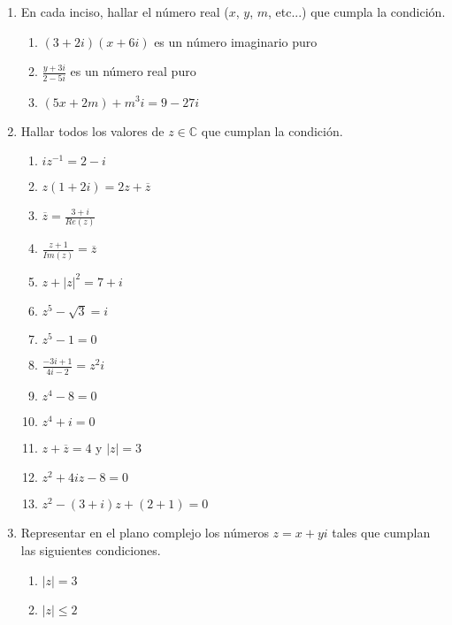 \documentclass[a4paper]{article}
\newcommand{\exercise}{\item}
\newcommand{\df}[2]{\displaystyle\frac{#1}{#2}}
\newcommand{\conj}[1]{\overline{#1}}
\begin{document}
\begin{enumerate}
\begin{multicols}{2}
\begin{enumerate} [label=(\alph*)]
		\item $|z.(1+2i)|^2=(|z|.|3+4i|)^2$
		\item $z+\conj{z} \in \mathbb{R}$
		\item $z-\conj{z} \not\in \mathbb{R}$
		\item $|z-w|=d(z,w)$
		\item $(z-\conj{z})^2=-4Im(z)^2$
	\end{enumerate}
	\end{multicols}
	\exercise En cada inciso, hallar el número real ($x$, $y$, $m$, etc...) que cumpla la condición.
	\begin{enumerate} [label=(\alph*)]
		\item $(3+2i)(x+6i)$ es un número imaginario puro
		\item $\df{y+3i}{2-5i}$ es un número real puro
		\item $(5x+2m)+m^3i = 9-27i$
	\end{enumerate}
	\exercise Hallar todos los valores de $z \in \mathbb{C}$ que cumplan la condición.
	\begin{multicols}{2}
	\begin{enumerate} [label=(\alph*)]
		\item $iz^{-1}=2-i$
		\item $z(1+2i)=2z+\conj{z}$
		\item $\conj{z}=\df{3+i}{Re(z)}$
		\item $\df{z+1}{Im(z)}=\conj{z}$
		\item $z+|z|^2=7+i$
		\item $z^5-\sqrt{3}=i$
		\item $z^5-1=0$
		\item $\df{-3i+1}{4i-2}=z^2i$
		\item $z^4-8=0$
		\item $z^4+i=0$
		\item $z+\conj{z}=4$ y $|z|=3$
		\item $z^2+4iz-8=0$
		\item $z^2-(3+i)z+(2+1)=0$
	\end{enumerate}
	\end{multicols}
	\exercise Representar en el plano complejo los números $z=x+yi$ tales que cumplan las siguientes condiciones.
	\begin{multicols}{2}
	\begin{enumerate} [label=(\alph*)]
		\item $|z|=3$
		\item $|z|\leq 2$

\end{enumerate}
\end{multicols}
\end{enumerate}
\end{document}
